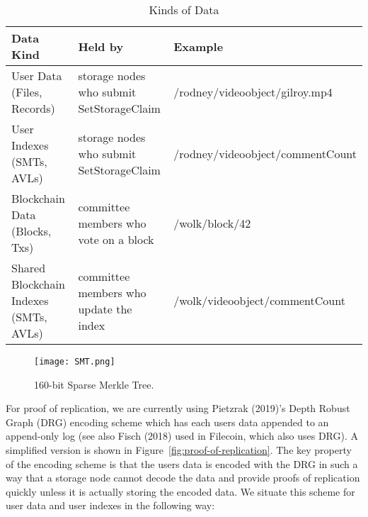 \documentclass[journal]{IEEEtran}
\newcommand{\tx}[1]{\textsf{#1}}
\begin{document}
\begin{table*}[h]
 \begin{small}
    \begin{tabular}{l|l|l}
      Data Kind        & Held by & Example \\ \hline
      User Data (Files, Records)        & storage nodes who submit \tx{SetStorageClaim} & /rodney/videoobject/gilroy.mp4 \\
      User Indexes (SMTs, AVLs)   & storage nodes who submit \tx{SetStorageClaim} & /rodney/videoobject/commentCount \\
      Blockchain Data (Blocks, Txs)  & committee members who vote on a block          & /wolk/block/42 \\
      Shared Blockchain Indexes (SMTs, AVLs)  & committee members who update the index         & /wolk/videoobject/commentCount \\
    \end{tabular}
    \caption{Kinds of Data}
    \label{tab:datatypes}
 \end{small}
\end{table*}

\begin{figure}
    \centering
    \texttt{[image: SMT.png]}
    \caption{160-bit Sparse Merkle Tree.}
    \label{fig:smt}
\end{figure}

For proof of replication, we are currently using Pietzrak (2019)'s Depth Robust Graph (DRG) encoding scheme \cite{pietrzak:LIPIcs:2018:10152} which has each users data appended to an append-only log (see also Fisch (2018) \cite{cryptoeprint:2018:678} used in Filecoin, which also uses DRG).  A simplified version is shown in Figure~\ref{fig:proof-of-replication}.  The key property of the encoding scheme is that the users data is encoded with the DRG in such a way that a storage node cannot decode the data and provide proofs of replication quickly unless it is actually storing the encoded data.  We situate this scheme for user data and user indexes in the following way:
\end{document}
